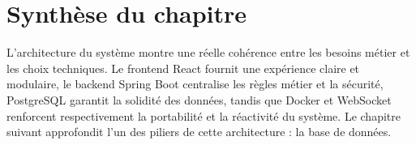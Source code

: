 \section{Synthèse du chapitre}
L'architecture du système montre une réelle cohérence entre les besoins métier et les choix techniques. Le frontend React fournit une expérience claire et modulaire, le backend Spring Boot centralise les règles métier et la sécurité, PostgreSQL garantit la solidité des données, tandis que Docker et WebSocket renforcent respectivement la portabilité et la réactivité du système. Le chapitre suivant approfondit l'un des piliers de cette architecture : la base de données.









